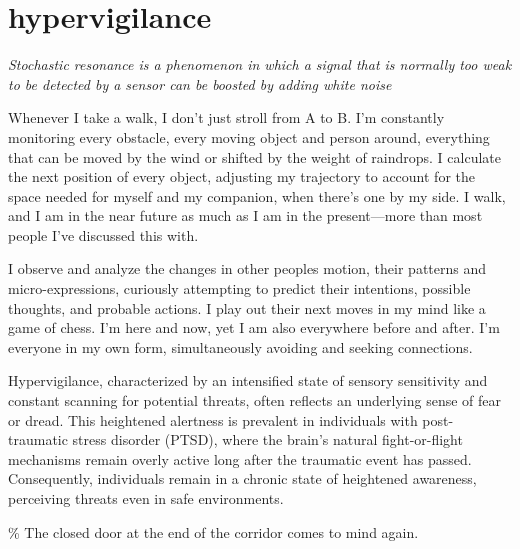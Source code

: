 \chapter*{hypervigilance}
\begin{center}
\vspace{2cm}
\begin{flushright}
\large
\textit{Stochastic resonance is a phenomenon in which a signal that is normally too weak to be detected by a sensor can be boosted by adding white noise}
\end{flushright}
\vspace{2cm}
\end{center}
\normalsize

\newpage  %
Whenever I take a walk, I don't just stroll from A to B. I'm constantly monitoring every obstacle, every moving object and person around, everything that can be moved by the wind or shifted by the weight of raindrops. I calculate the next position of every object, adjusting my trajectory to account for the space needed for myself and my companion, when there's one by my side. I walk, and I am in the near future as much as I am in the present—more than most people I've discussed this with.

I observe and analyze the changes in other peoples motion, their patterns and micro-expressions, curiously attempting to predict their intentions, possible thoughts, and probable actions. I play out their next moves in my mind like a game of chess. I'm here and now, yet I am also everywhere before and after. I'm everyone in my own form, simultaneously avoiding and seeking connections.

Hypervigilance, characterized by an intensified state of sensory sensitivity and constant scanning for potential threats, often reflects an underlying sense of fear or dread. This heightened alertness is prevalent in individuals with post-traumatic stress disorder (PTSD), where the brain's natural fight-or-flight mechanisms remain overly active long after the traumatic event has passed. Consequently, individuals remain in a chronic state of heightened awareness, perceiving threats even in safe environments.  

{\scriptsize \textcolor{comment}{\% The closed door at the end of the corridor comes to mind again. }}

